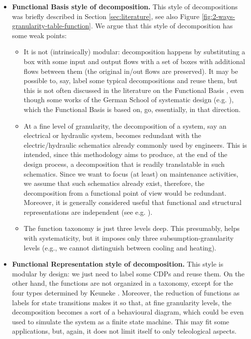 \documentclass[
]{ceurart}
\begin{document}
\begin{itemize}
  \item \textbf{Functional Basis style of decomposition.} This style of decompositions was briefly described in Section \ref{sec:literature}, see also Figure \ref{fig:2-ways-granularity-table-function}. We argue that this style of decomposition has some weak points:
  \begin{itemize}
    \item It is not (intrinsically) modular: decomposition happens by substituting a box with some input and output flows with a set of boxes with additional flows between them (the original in/out flows are preserved). It may be possible to, say, label some typical decompositions and reuse them, but this is not often discussed in the literature on the Functional Basis , even though some works of the German School of systematic design (e.g. \cite{rothKonstruierenMitKonstruktionskatalogen2000}), which the Functional Basis is based on, go, essentially, in that direction. 
    \item At a fine level of granularity, the decomposition of a system, say an electrical or hydraulic system, becomes redundant with the electric/hydraulic schematics already commonly used by engineers. This is intended, since this methodology aims to produce, at the end of the design process, a decomposition that is readily translatable in such schematics. Since we want to focus (at least) on maintenance activities, we assume that such schematics already exist, therefore, the decomposition from a functional point of view would be redundant. Moreover, it is generally considered useful that functional and structural representations are independent (see e.g. \cite{ISOIEC8134612009}).
    \item The function taxonomy is just three levels deep. This presumably, helps with systematicity, but it imposes only three subsumption-granularity levels (e.g., we cannot distinguish between cooling and heating).
  \end{itemize}
  \item \textbf{Functional Representation style of decomposition.} This style is modular by design: we just need to label some CDPs and reuse them. On the other hand, the functions are not organized in a taxonomy, except for the four types determined by Keuneke \cite{keuneke_device_1991}. Moreover, the reduction of functions as labels for state transitions makes it so that, at fine granularity levels, the decomposition becomes a sort of a behavioural diagram, which could be even used to simulate the system as a finite state machine. This may fit some applications, but, again, it does not limit itself to only teleological aspects.

\end{itemize}
\end{document}
